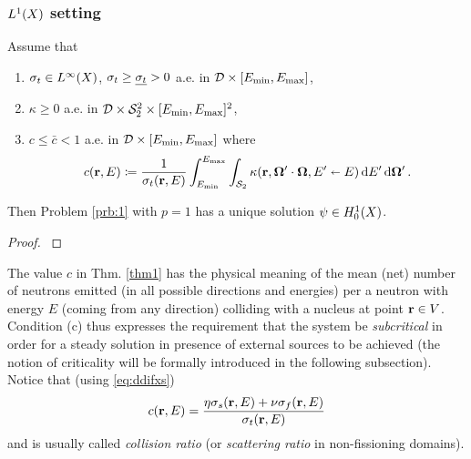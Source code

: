 \subsubsection{$\Lp[1](X)$ setting}
\begin{theorem}\label{thm1}
Assume that
\begin{enumerate}[label=(\alph*)]
	\item $\sigma_t \in \Lp[\infty](X)$, $\sigma_t \geq \mst > 0$ a.e. in $\VV\times[\Emin,\Emax]$,
	\item $\kappa \geq 0$ a.e. in $\VV\times\Sphere^2\times[\Emin,\Emax]^2$,
	\item $\displaystyle c \leq \bar c < 1$ a.e. in $\VV\times[\Emin,\Emax]$ where
	  \begin{equation}\label{eq:c}
	    c(\br,E) \coloneqq \frac{1}{\sigma_t(\br,E)}\int_{\Emin}^{\Emax}\int_{\Sphere} \kappa(\br,\bomega'\cdot\bomega,
	    E'\sla E)\,\d{E'}\d{\bomega'}.
	  \end{equation}
\end{enumerate}
Then Problem \ref{prb:1} with $p = 1$ has a unique solution $\psi\in\Hpnot[1](X)$.
\end{theorem}
\begin{proof}
\cite[Chap. XXI, \S 2, Proposition 5]{DautrayLions}
\end{proof}

The value $c$ in Thm. \ref{thm1} has the physical meaning of the mean (net) number of neutrons emitted (in all possible
directions and energies) per a neutron with energy $E$ (coming from any direction) colliding with a nucleus at point
\mbox{$\br\in V$}. 
Condition (c) thus expresses the requirement that the system be \textit{subcritical} in order for a
steady solution in presence of external sources to be achieved (the notion of criticality will be formally introduced in the following
subsection).
Notice that (using \eqref{eq:ddifxs})
\begin{equation}\label{eq:scattering_ratio}
	c(\br,E) = \frac{\eta\sigma_s(\br,E) + \nu\sigma_f(\br,E)}{\sigma_t(\br,E)}
\end{equation}
and is usually called \textit{collision ratio}  (or
\textit{scattering ratio} in non-fissioning domains).

